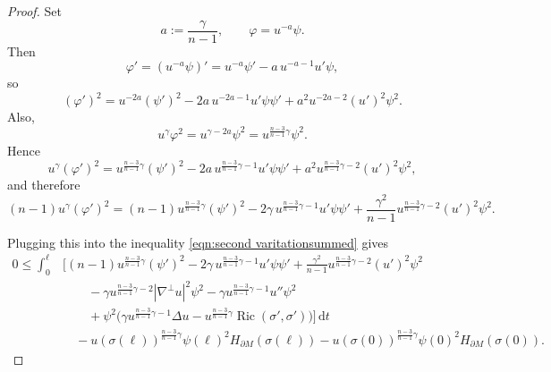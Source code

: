 \documentclass[10pt,a4paper]{amsart}
\DeclareMathOperator{\Ric}{Ric}
\renewcommand{\leq}{\leqslant}
\begin{document}
\begin{proof}
    Set
\[
a:=\frac{\gamma}{n-1},
\qquad
\varphi=u^{-a}\psi.
\]
Then
\[
\varphi'=(u^{-a}\psi)'=u^{-a}\psi'-a\,u^{-a-1}u'\psi,
\]
so
\[
(\varphi')^2
=
u^{-2a}(\psi')^2-2a\,u^{-2a-1}u'\psi\psi'
+a^2u^{-2a-2}(u')^2\psi^2.
\]
Also,
\[
u^\gamma\varphi^2=u^{\gamma-2a}\psi^2
=
u^{\frac{n-3}{n-1}\gamma}\psi^2.
\]
Hence
\[
u^\gamma(\varphi')^2
=
u^{\frac{n-3}{n-1}\gamma}(\psi')^2
-2a\,u^{\frac{n-3}{n-1}\gamma-1}u'\psi\psi'
+a^2u^{\frac{n-3}{n-1}\gamma-2}(u')^2\psi^2,
\]
and therefore
\[
(n-1)u^\gamma(\varphi')^2
=
(n-1)u^{\frac{n-3}{n-1}\gamma}(\psi')^2
-2\gamma\,u^{\frac{n-3}{n-1}\gamma-1}u'\psi\psi'
+\frac{\gamma^2}{n-1}u^{\frac{n-3}{n-1}\gamma-2}(u')^2\psi^2.
\]

Plugging this into the inequality \eqref{eqn:second varitationsummed} gives
\begin{align*}
0\leq \int_0^\ell &\Big[
(n-1)u^{\frac{n-3}{n-1}\gamma}(\psi')^2
-2\gamma\,u^{\frac{n-3}{n-1}\gamma-1}u'\psi\psi'
+\frac{\gamma^2}{n-1}u^{\frac{n-3}{n-1}\gamma-2}(u')^2\psi^2 \\
&\qquad
-\gamma u^{\frac{n-3}{n-1}\gamma-2}|\nabla^\perp u|^2\psi^2
-\gamma u^{\frac{n-3}{n-1}\gamma-1}u''\psi^2 \\
&\qquad
+\psi^2\Big(\gamma u^{\frac{n-3}{n-1}\gamma-1}\Delta u
-u^{\frac{n-3}{n-1}\gamma}\Ric(\sigma',\sigma')\Big)
\Big]\,\mathrm{d}t \\
&\quad
-u(\sigma(\ell))^{\frac{n-3}{n-1}\gamma}\psi(\ell)^2H_{\partial M}(\sigma(\ell))
-u(\sigma(0))^{\frac{n-3}{n-1}\gamma}\psi(0)^2H_{\partial M}(\sigma(0)).
\end{align*}


\end{proof}
\end{document}
